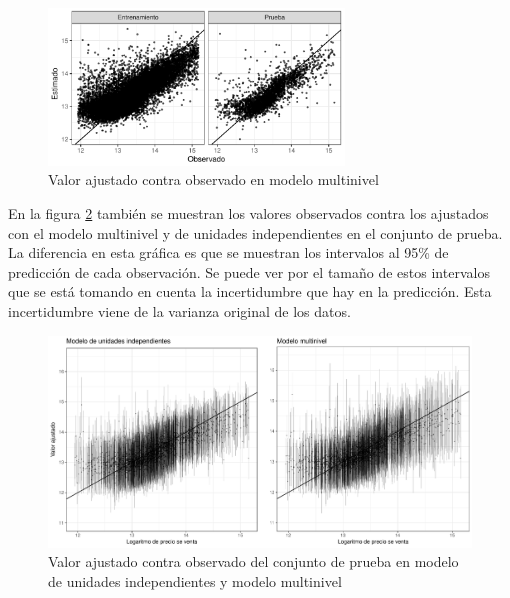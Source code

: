 \begin{figure}[H]
    \centering
    \includegraphics[width=0.7\textwidth]{images/three_levels_obs_vs_pred.pdf}
    \caption{Valor ajustado contra observado en modelo multinivel}
    \label{fig:three_levels_obs_vs_pred}
\end{figure}

En la figura \ref{fig:res_int_pred_three_levels_no_pooling} también se muestran los valores observados contra los ajustados con el modelo multinivel y de unidades independientes en el conjunto de prueba. La diferencia en esta gráfica es que se muestran los intervalos al 95\% de predicción de cada observación. Se puede ver por el tamaño de estos intervalos que se está tomando en cuenta la incertidumbre que hay en la predicción. Esta incertidumbre viene de la varianza original de los datos.

\begin{figure}[H]
    \centering
    \includegraphics[width=1.02\textwidth]{images/res_int_pred_three_levels_no_pooling.pdf}
    \caption{Valor ajustado contra observado del conjunto de prueba en modelo de unidades independientes y modelo multinivel}
    \label{fig:res_int_pred_three_levels_no_pooling}
\end{figure}



